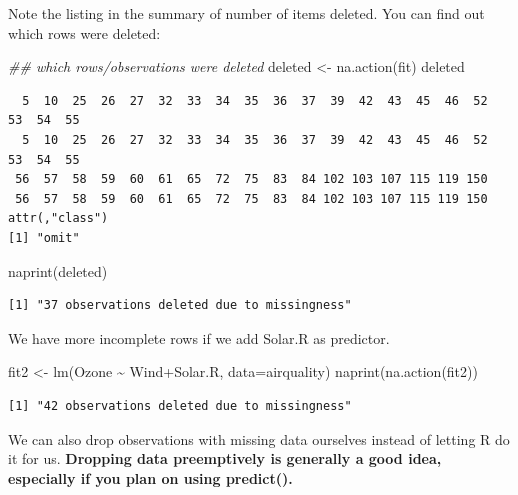 \documentclass[
  letterpaper,
  DIV=11,
  numbers=noendperiod]{scrreprt}
\newenvironment{Shaded}{}{}
\newcommand{\AttributeTok}[1]{\textcolor[rgb]{0.49,0.56,0.16}{#1}}
\newcommand{\DocumentationTok}[1]{\textcolor[rgb]{0.73,0.13,0.13}{\textit{#1}}}
\newcommand{\FunctionTok}[1]{\textcolor[rgb]{0.02,0.16,0.49}{#1}}
\newcommand{\NormalTok}[1]{#1}
\newcommand{\OtherTok}[1]{\textcolor[rgb]{0.00,0.44,0.13}{#1}}
\newcommand{\SpecialCharTok}[1]{\textcolor[rgb]{0.25,0.44,0.63}{#1}}
\begin{document}
Note the listing in the summary of number of items deleted. You can find
out which rows were deleted:

\begin{Shaded}
\begin{Highlighting}[]
\DocumentationTok{\#\# which rows/observations were deleted}
\NormalTok{  deleted }\OtherTok{\textless{}{-}} \FunctionTok{na.action}\NormalTok{(fit)}
\NormalTok{  deleted}
\end{Highlighting}
\end{Shaded}

\begin{verbatim}
  5  10  25  26  27  32  33  34  35  36  37  39  42  43  45  46  52  53  54  55 
  5  10  25  26  27  32  33  34  35  36  37  39  42  43  45  46  52  53  54  55 
 56  57  58  59  60  61  65  72  75  83  84 102 103 107 115 119 150 
 56  57  58  59  60  61  65  72  75  83  84 102 103 107 115 119 150 
attr(,"class")
[1] "omit"
\end{verbatim}

\begin{Shaded}
\begin{Highlighting}[]
  \FunctionTok{naprint}\NormalTok{(deleted)}
\end{Highlighting}
\end{Shaded}

\begin{verbatim}
[1] "37 observations deleted due to missingness"
\end{verbatim}

We have more incomplete rows if we add Solar.R as predictor.

\begin{Shaded}
\begin{Highlighting}[]
\NormalTok{  fit2 }\OtherTok{\textless{}{-}} \FunctionTok{lm}\NormalTok{(Ozone }\SpecialCharTok{\textasciitilde{}}\NormalTok{ Wind}\SpecialCharTok{+}\NormalTok{Solar.R, }\AttributeTok{data=}\NormalTok{airquality)}
  \FunctionTok{naprint}\NormalTok{(}\FunctionTok{na.action}\NormalTok{(fit2))}
\end{Highlighting}
\end{Shaded}

\begin{verbatim}
[1] "42 observations deleted due to missingness"
\end{verbatim}

We can also drop observations with missing data ourselves instead of
letting R do it for us. \textbf{Dropping data preemptively is generally
a good idea, especially if you plan on using predict().}
\end{document}
